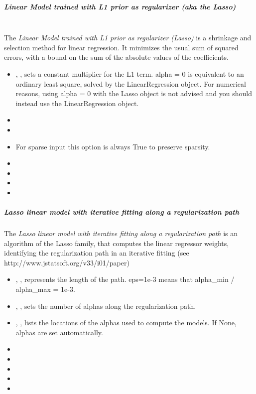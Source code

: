 \subparagraph{Linear Model trained with L1 prior as regularizer (aka the Lasso)}
\mbox{}
\\The \textit{Linear Model trained with L1 prior as regularizer (Lasso)} is a
shrinkage and selection method for linear regression.
%
It minimizes the usual sum of squared errors, with a bound on the sum of the
absolute values of the coefficients.
%
\begin{itemize}
  \item {}, , sets a constant
  multiplier for the L1 term.
  alpha = 0 is equivalent to an ordinary least square, solved by the
  LinearRegression object.
  For numerical reasons, using alpha = 0 with the Lasso object is not advised
  and you should instead use the LinearRegression object.
  \item {}
  \item {}
  \item \precomputeDescription{}
  \nb For sparse input this option is always True to preserve sparsity.
  \item \maxIterDescription{}
  \item {}
  \item \warmStartDescription{}
  \item \positiveDescription{}
\end{itemize}

\subparagraph{Lasso linear model with iterative fitting along a regularization
  path}
\mbox{}

The \textit{Lasso linear model with iterative fitting along a regularization
path} is an algorithm of the Lasso family, that computes the linear regressor weights, 
identifying the regularization path in an iterative fitting (see http://www.jstatsoft.org/v33/i01/paper)

\begin{itemize}
  \item {}, , represents the length of
  the path.
  eps=1e-3 means that alpha\_min / alpha\_max = 1e-3.
  \item {}, , sets the number of
  alphas along the regularization path.
  \item {}, , lists the
  locations of the alphas used to compute the models.
  If None, alphas are set automatically.
  \item \precomputeDescription{}
  \item \maxIterDescription{}
  \item {}
  \item \verDescriptionB{}
  \item \positiveDescription{}
\end{itemize}

